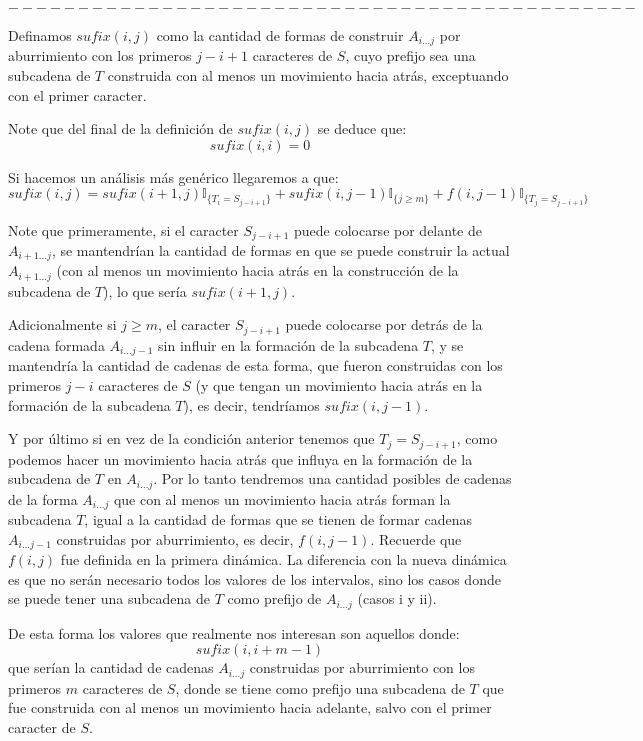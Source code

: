 \documentclass[a4paper]{article}
\begin{document}
    $$---------------------------------------------$$
    
    Definamos $sufix(i,j)$ como la cantidad de formas de construir $A_{i...j}$ por aburrimiento con los primeros $j-i+1$ caracteres de $S$, cuyo prefijo sea una subcadena de $T$ construida con al menos un movimiento hacia atrás, exceptuando con el primer caracter.
    
    Note que del final de la definición de $sufix(i,j)$ se deduce que:
    $$sufix(i,i) = 0$$
    
    Si hacemos un análisis más genérico llegaremos a que:
    $$sufix(i,j) = sufix(i+1,j)\mathbb{I}_{ \{ T_i = S_{j-i+1} \}} + 
    sufix(i, j-1) \mathbb{I}_{ \{ j \ge m \}} + 
    f(i, j-1) \mathbb{I}_{ \{ T_j = S_{j-i+1}\}}$$
    
    Note que primeramente, si el caracter $S_{j-i+1}$ puede colocarse por delante de $A_{i+1...j}$, se mantendrían la cantidad de formas en que se puede construir la actual $A_{i+1...j}$ (con al menos un movimiento hacia atrás en la construcción de la subcadena de $T$), lo que sería $sufix(i+1,j)$.
    
    Adicionalmente si $j \ge m$, el caracter $S_{j-i+1}$ puede colocarse por detrás de la cadena formada $A_{i...j-1}$ sin influir en la formación de la subcadena $T$, y se mantendría la cantidad de cadenas de esta forma, que fueron construidas con los primeros $j-i$ caracteres de $S$ (y que tengan un movimiento hacia atrás en la formación de la subcadena $T$), es decir, tendríamos $sufix(i, j-1)$.
    
    Y por último si en vez de la condición anterior tenemos que $T_j = S_{j-i+1}$, como podemos hacer un movimiento hacia atrás que influya en la formación de la subcadena de $T$ en $A_{i...j}$. Por lo tanto tendremos una cantidad posibles de cadenas de la forma $A_{i...j}$ que con al menos un movimiento hacia atrás forman la subcadena $T$, igual a la cantidad de formas que se tienen de formar cadenas $A_{i...j-1}$ construidas por aburrimiento, es decir, $f(i,j-1)$. Recuerde que $f(i,j)$ fue definida en la primera dinámica. La diferencia con la nueva dinámica es que no serán necesario todos los valores de los intervalos, sino los casos donde se puede tener una subcadena de $T$ como prefijo de $A_{i...j}$ (casos i y ii).
    
    De esta forma los valores que realmente nos interesan son aquellos donde:
    $$sufix(i, i+m-1)$$
    que serían la cantidad de cadenas $A_{i...j}$ construidas por aburrimiento con los primeros $m$ caracteres de $S$, donde se tiene como prefijo una subcadena de $T$ que fue construida con al menos un movimiento hacia adelante, salvo con el primer caracter de $S$.
    
\end{document}
